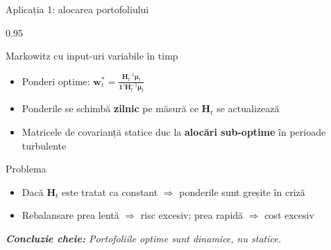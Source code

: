 \documentclass[9pt, aspectratio=169, t]{beamer}
\begin{document}
\begin{frame}{Aplicația 1: alocarea portofoliului}
    \begin{cminipage}{0.95\textwidth}
    {\footnotesize
    \begin{block}{Markowitz cu input-uri variabile în timp}
        \begin{itemize}\setlength{\itemsep}{2pt}
            \item Ponderi optime: $\mathbf{w}_t^{*} = \frac{\mathbf{H}_t^{-1} \boldsymbol{\mu}_t}{\mathbf{1}' \mathbf{H}_t^{-1} \boldsymbol{\mu}_t}$
            \item Ponderile se schimbă \textbf{zilnic} pe măsură ce $\mathbf{H}_t$ se actualizează
            \item Matricele de covarianță statice duc la \textbf{alocări sub-optime} în perioade turbulente
        \end{itemize}
    \end{block}
    \vspace{0.1cm}
    \begin{alertblock}{Problema}
        \begin{itemize}\setlength{\itemsep}{0pt}
            \item Dacă $\mathbf{H}_t$ este tratat ca constant $\Rightarrow$ ponderile sunt greșite în criză
            \item Rebalansare prea lentă $\Rightarrow$ risc excesiv; prea rapidă $\Rightarrow$ cost excesiv
        \end{itemize}
    \end{alertblock}
    \vspace{0.2cm}
    \textit{\textbf{Concluzie cheie:} Portofoliile optime sunt dinamice, nu statice.}
    }
    \end{cminipage}
\end{frame}
\end{document}
